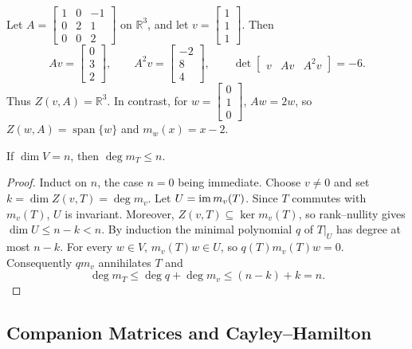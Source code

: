 \begin{Example}
Let $A=\begin{bmatrix}1&0&-1\\0&2&1\\0&0&2\end{bmatrix}$ on $\mathbb R^3$, and let $v=\begin{bmatrix}1\\1\\1\end{bmatrix}$. Then
\begin{equation*}
Av=\begin{bmatrix}0\\3\\2\end{bmatrix},\qquad A^2v=\begin{bmatrix}-2\\8\\4\end{bmatrix},\qquad \det\begin{bmatrix}v&Av&A^2v\end{bmatrix}=-6.
\end{equation*}
Thus $Z(v,A)=\mathbb R^3$. In contrast, for $w=\begin{bmatrix}0\\1\\0\end{bmatrix}$, $Aw=2w$, so $Z(w,A)=\operatorname{span}\{w\}$ and $m_w(x)=x-2$.
\end{Example}

\begin{Theorem}\label{thm:MinimalDegreeBound}
If $\dim V=n$, then $\deg m_T\le n$.
\end{Theorem}
\begin{proof}
Induct on $n$, the case $n=0$ being immediate. Choose $v\ne0$ and set $k=\dim Z(v,T)=\deg m_v$. Let $U=\operatorname{im} m_v(T)$. Since $T$ commutes with $m_v(T)$, $U$ is invariant. Moreover, $Z(v,T)\subseteq\ker m_v(T)$, so rank--nullity gives $\dim U\le n-k<n$. By induction the minimal polynomial $q$ of $T|_U$ has degree at most $n-k$. For every $w\in V$, $m_v(T)w\in U$, so $q(T)m_v(T)w=0$. Consequently $qm_v$ annihilates $T$ and
\begin{equation*}
\deg m_T\le\deg q+\deg m_v\le(n-k)+k=n.
\end{equation*}
\end{proof}

\subsection{Companion Matrices and Cayley--Hamilton}

